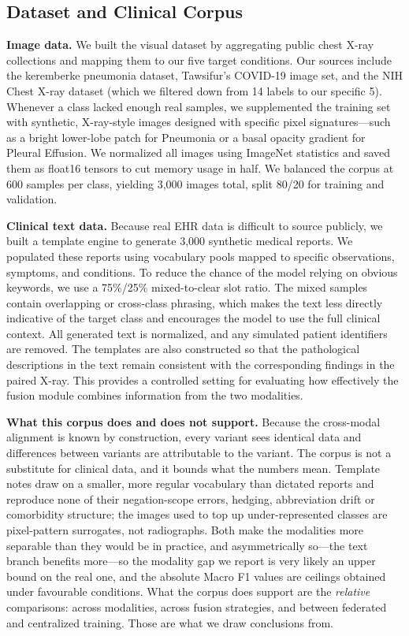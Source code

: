 \documentclass[letterpaper, conference]{IEEEtran}
\begin{document}
\subsection{Dataset and Clinical Corpus}

\textbf{Image data.}
We built the visual dataset by aggregating public chest X-ray collections and mapping them to our five target conditions. Our sources include the keremberke pneumonia dataset, Tawsifur's COVID-19 image set, and the NIH Chest X-ray dataset (which we filtered down from 14 labels to our specific 5). Whenever a class lacked enough real samples, we supplemented the training set with synthetic, X-ray-style images designed with specific pixel signatures---such as a bright lower-lobe patch for Pneumonia or a basal opacity gradient for Pleural Effusion. We normalized all images using ImageNet statistics and saved them as float16 tensors to cut memory usage in half. We balanced the corpus at 600 samples per class, yielding 3,000 images total, split 80/20 for training and validation.

\textbf{Clinical text data.}
Because real EHR data is difficult to source publicly, we built a template engine to generate 3,000 synthetic medical reports. We populated these reports using vocabulary pools mapped to specific observations, symptoms, and conditions. To reduce the chance of the model relying on obvious keywords, we use a 75\%/25\% mixed-to-clear slot ratio. The mixed samples contain overlapping or cross-class phrasing, which makes the text less directly indicative of the target class and encourages the model to use the full clinical context. All generated text is normalized, and any simulated patient identifiers are removed. The templates are also constructed so that the pathological descriptions in the text remain consistent with the corresponding findings in the paired X-ray. This provides a controlled setting for evaluating how effectively the fusion module combines information from the two modalities.

\label{sec:corpus}
\textbf{What this corpus does and does not support.}
Because the cross-modal alignment is known by construction, every variant sees identical data and differences between variants are attributable to the variant. The corpus is not a substitute for clinical data, and it bounds what the numbers mean. Template notes draw on a smaller, more regular vocabulary than dictated reports and reproduce none of their negation-scope errors, hedging, abbreviation drift or comorbidity structure; the images used to top up under-represented classes are pixel-pattern surrogates, not radiographs. Both make the modalities more separable than they would be in practice, and asymmetrically so---the text branch benefits more---so the modality gap we report is very likely an upper bound on the real one, and the absolute Macro F1 values are ceilings obtained under favourable conditions. What the corpus does support are the \emph{relative} comparisons: across modalities, across fusion strategies, and between federated and centralized training. Those are what we draw conclusions from.
\end{document}
